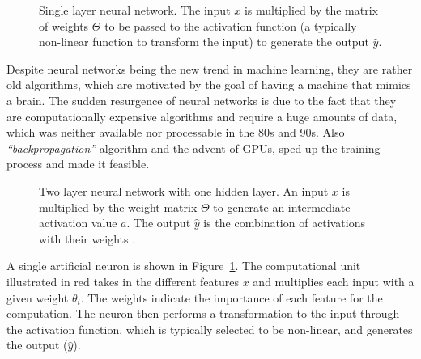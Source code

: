 \begin{figure}
\centering 
\resizebox{0.55\textwidth}{0.3\textwidth}{      

}
\caption{Single layer neural network. The input $x$ is multiplied by the matrix of weights $\Theta$ to be passed to the activation function (a typically non-linear function to transform the input) to generate the output $\hat { y }$. \protect \footnotemark}
\label{fig:preceptron}
\end{figure}
\noindent
Despite neural networks being the new trend in machine learning, they are rather old algorithms, which are motivated by the goal of having a machine that mimics a brain. The sudden resurgence of neural networks is due to the fact that they are computationally expensive algorithms and require a huge amounts of data, which was neither available nor processable in the 80s and 90s. Also \emph{``backpropagation''} algorithm and the advent of GPUs, sped up the training process and made it feasible.\\
\begin{figure}
\centering 
\resizebox{0.65\textwidth}{0.4\textwidth}{      

}
\caption{Two layer neural network with one hidden layer. An input $x$ is multiplied by the weight matrix $\Theta$ to generate an intermediate activation value $a$. The output $\hat { y } $ is the combination of activations with their weights \protect \footnotemark .}

\label{fig:nn}

\end{figure}
\noindent
A single artificial neuron is shown in Figure~\ref{fig:preceptron}. The computational unit illustrated in red takes in the different features $x$ and multiplies each input with a given weight $\theta_i$.
The weights indicate the importance of each feature for the computation. The neuron then performs a transformation to the input through the activation function, which is typically selected to be non-linear, and generates the output ($\hat { y } $).
